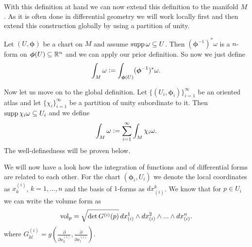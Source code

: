 \documentclass[../master_thesis.tex]{subfiles}
\begin{document}
With this definition at hand we can now extend this definition to 
the manifold $M$. As it is often done in 
differential geometry we will work locally first and then extend this 
construction globally by using a partition of unity.

Let $(U,\boldsymbol{\phi})$ be a chart on $M$ and assume $\operatorname{supp} \omega \subseteq U$. 
Then $(\boldsymbol{\phi}^{-1})^* \omega$
is a $n$-form on $\boldsymbol{\phi}(U) \subseteq \mathbb{R}^n$ and 
we can apply our prior definition. So now we just define 
\begin{align*}
    \int_M \omega \vcentcolon= \int_{\boldsymbol{\phi}(U)} (\boldsymbol{\phi}^{-1})^* \omega.
\end{align*}

Now let us move on to the global definition. Let $\{(U_i,\boldsymbol{\phi}_i)\}_{i=1}^\infty$
be an oriented atlas and let $\{ \chi_i \}_{i=1}^\infty$ be a partition 
of unity subordinate to it. 
Then $\operatorname{supp} \chi_i \omega \subseteq U_i$ 
and we define 
\begin{align*}
    \int_M \omega \vcentcolon= \sum_{i=1}^\infty \int_M \chi_i \omega.
\end{align*} 
The well-definedness will be proven below.

We will now have a look how the integration of functions and of 
differential forms are related to each other. 
For the chart $(\boldsymbol{\phi}_i, U_i)$ we denote the local coordinates as 
$x^{(i)}_k$, $k=1,...,n$ and the basis of $1$-forms as $dx_{(i)}^k$.
We know that for $p \in U_i$ we can write the volume form as
\begin{align*}
    \operatorname{vol}_p = \sqrt{ \det G^{(i)}(p)} \,
        dx_{(i)}^1 \wedge dx_{(i)}^2 \wedge ... \wedge dx_{(i)}^n.
\end{align*}
where $G^{(i)}_{kl} = g(\frac{\partial}{\partial x^{(i)}_k},\frac{\partial}{\partial x^{(i)}_l} )$.
\end{document}
